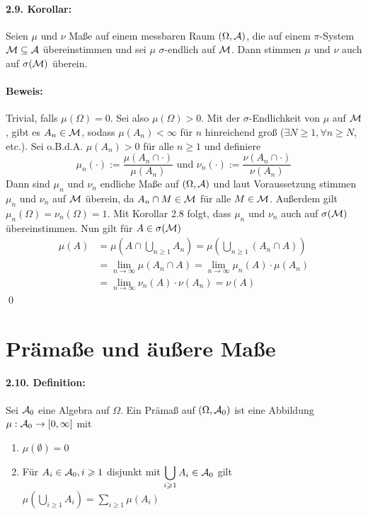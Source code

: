 \paragraph{2.9. Korollar:}Seien $\mu$ und $\nu$ Ma\ss{}e auf einem messbaren Raum $(\Omega,\mathcal{A})$, die auf einem $\pi$-System $\mathcal{M}\subseteq\mathcal{A}$ \"ubereinstimmen und sei $\mu$ $\sigma$-endlich auf $\mathcal{M}$. Dann stimmen $\mu$ und $\nu$ auch auf $\sigma(\mathcal{M})$ \"uberein. 

\paragraph{Beweis:}Trivial, falls $\mu(\Omega)=0$. Sei also $\mu(\Omega)>0$. Mit der $\sigma$-Endlichkeit von $\mu$ auf $\mathcal{M}$, gibt es $A_n\in\mathcal{M}$, sodass $\mu(A_n)<\infty$ f\"ur $n$ hinreichend gro\ss{} ($\exists N\geq1,\forall n\geq N$, etc.). Sei o.B.d.A. $\mu(A_n)>0$ f\"ur alle $n\geq1$ und definiere
$$\mu_n(\cdot):=\dfrac{\mu(A_n\cap\cdot)}{\mu(A_n)}\text{ und }\nu_n(\cdot):=\dfrac{\nu(A_n\cap\cdot)}{\nu(A_n)}$$
Dann sind $\mu_n$ und $\nu_n$ endliche Ma\ss{}e auf $(\Omega,\mathcal{A})$ und laut Voraussetzung stimmen $\mu_n$ und $\nu_n$ auf $\mathcal{M}$ \"uberein, da $A_n\cap M\in\mathcal{M}$ f\"ur alle $M\in\mathcal{M}$. Au\ss{}erdem gilt $\mu_n(\Omega)=\nu_n(\Omega)=1$. Mit Korollar 2.8 folgt, dass $\mu_n$ und $\nu_n$ auch auf $\sigma(\mathcal{M})$ \"ubereinstimmen. Nun gilt f\"ur $A\in\sigma(\mathcal{M})$
\begin{align*}
    \mu(A)&=\mu\left(A\cap\bigcup_{n\geq1}A_n\right)=\mu\left(\bigcup_{n\geq1}(A_n\cap A)\right)\\
    &=\lim_{n\to\infty}\mu(A_n\cap A)=\lim_{n\to\infty}\mu_n(A)\cdot\mu(A_n)\\
    &=\lim_{n\to\infty}\nu_n(A)\cdot\nu(A_n)=\nu(A)
\end{align*}
\qed

\section*{Pr\"ama\ss{}e und \"au\ss{}ere Ma\ss{}e}

\paragraph{2.10. Definition:}Sei $\mathcal{A}_0$ eine Algebra auf $\Omega$. Ein Pr\"ama\ss{} auf $(\Omega,\mathcal{A}_0)$ ist eine Abbildung $\mu:\nobreak\mathcal{A}_0\to\nobreak [0,\infty]$ mit
\begin{enumerate}[label=(\roman*)]
    \item $\mu(\emptyset)=0$
    \item F\"ur $A_i\in\mathcal{A}_0,i\geqslant1$ disjunkt mit $\displaystyle\bigcup_{i\geqslant1}A_i\in\mathcal{A}_0$ gilt $\displaystyle\mu\left(\bigcup_{i\geq1}A_i\right)=\sum_{i\geq1}\mu(A_i)$
\end{enumerate}

